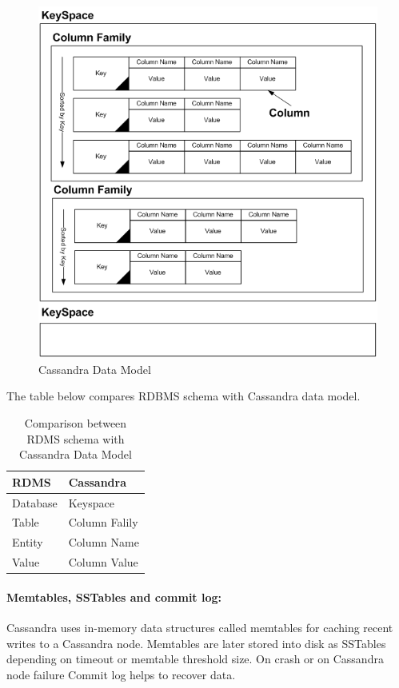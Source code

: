 	  \begin{figure}[htb]
		\centering
		\includegraphics[scale=.5]{cassandra_data_model.png}
		\caption{Cassandra Data Model} 
		\label{cassandra_data_model}
	      \end{figure}

The table below compares RDBMS schema with Cassandra data model.\\
	  \begin{table}[ht]
	  \centering
	   \begin{tabular}{|l|l|}
	   \hline
	   {\bf RDMS}     & {\bf Cassandra}      \\ \hline 
	   Database & Keyspace       \\
	   Table    & Column Falily  \\
	   Entity   & Column Name    \\
	   Value    & Column Value   \\ \hline
	  \end{tabular}
	  \caption{Comparison between RDMS schema with Cassandra Data Model}
	  \end{table}

	  \paragraph{Memtables, SSTables and commit log:}
	    Cassandra uses in-memory data structures called memtables for caching recent writes to a Cassandra node.
	    Memtables are later stored into disk as SSTables depending on timeout or  memtable threshold size.
	    On crash or on Cassandra node failure Commit log helps to recover data.	    

